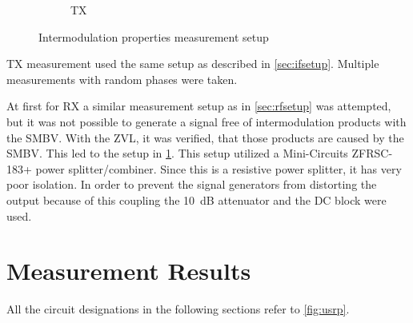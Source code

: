 \documentclass[12pt,a4paper,parskip=full]{scrartcl}
\begin{document}
\begin{figure}[htb]
    \begin{subfigure}[t]{.5\linewidth}
        \centering
        \caption{TX}
    \end{subfigure}
    \caption{Intermodulation properties measurement setup}
    \label{fig:imsetup}
\end{figure}
TX measurement used the same setup as described in \cref{sec:ifsetup}. Multiple
measurements with random phases were taken.

At first for RX a similar measurement setup as in \cref{sec:rfsetup} was attempted,
but it was not possible to generate a signal free of intermodulation products with
the SMBV. With the ZVL, it was verified, that those products are caused by the
SMBV. This led to the setup in \cref{fig:imsetup}. This setup utilized a Mini-Circuits
ZFRSC-183+ power splitter/combiner. Since this is a resistive power splitter, it has
very poor isolation\cite{pwrsplit}. In order to prevent the signal generators from
distorting the output because of this coupling the \SI{10}{\deci\bel} attenuator
and the DC block were used.
\clearpage
\section{Measurement Results}
All the circuit designations in the following sections refer to \cref{fig:usrp}.
\end{document}
